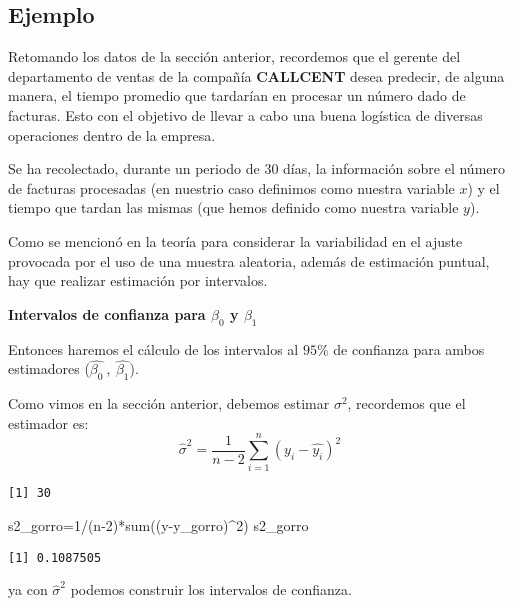 \documentclass[
  a4paper,
  oneside,
  openany]{book}
\newenvironment{Shaded}{\begin{snugshade}}{\end{snugshade}}
\newcommand{\DecValTok}[1]{\textcolor[rgb]{0.00,0.00,0.81}{#1}}
\newcommand{\FunctionTok}[1]{\textcolor[rgb]{0.00,0.00,0.00}{#1}}
\newcommand{\NormalTok}[1]{#1}
\newcommand{\OtherTok}[1]{\textcolor[rgb]{0.56,0.35,0.01}{#1}}
\newcommand{\SpecialCharTok}[1]{\textcolor[rgb]{0.00,0.00,0.00}{#1}}
\begin{document}
\hypertarget{ejemplo-17}{%
\subsection{Ejemplo}\label{ejemplo-17}}

Retomando los datos de la sección anterior, recordemos que el gerente del departamento de ventas de la compañía \textbf{CALLCENT} desea predecir, de alguna manera, el tiempo promedio que tardarían en procesar un número dado de facturas. Esto con el objetivo de llevar a cabo una buena logística de diversas operaciones dentro de la empresa.

Se ha recolectado, durante un periodo de 30 días, la información sobre el número de facturas procesadas (en nuestrio caso definimos como nuestra variable \(x\)) y el tiempo que tardan las mismas (que hemos definido como nuestra variable \(y\)).

Como se mencionó en la teoría para considerar la variabilidad en el ajuste provocada por el uso de una muestra aleatoria, además de estimación puntual, hay que realizar estimación por intervalos.

\textbf{Intervalos de confianza para \(\beta_{0}\) y \(\beta_{1}\)}

Entonces haremos el cálculo de los intervalos al \(95\%\) de confianza para ambos estimadores (\(\hat{\beta_{0}} \ , \ \hat{\beta_{1}}\)).

Como vimos en la sección anterior, debemos estimar \(\sigma^2\), recordemos que el estimador es: \[\hat{\sigma}^2=\frac{1}{n-2}\sum_{i=1}^{n}(y_{i}-\hat{y_{i}})^2\]

\begin{verbatim}
[1] 30
\end{verbatim}

\begin{Shaded}
\begin{Highlighting}[]
\NormalTok{s2\_gorro}\OtherTok{=}\DecValTok{1}\SpecialCharTok{/}\NormalTok{(n}\DecValTok{{-}2}\NormalTok{)}\SpecialCharTok{*}\FunctionTok{sum}\NormalTok{((y}\SpecialCharTok{{-}}\NormalTok{y\_gorro)}\SpecialCharTok{\^{}}\DecValTok{2}\NormalTok{)}
\NormalTok{s2\_gorro}
\end{Highlighting}
\end{Shaded}

\begin{verbatim}
[1] 0.1087505
\end{verbatim}

ya con \(\hat{\sigma}^2\) podemos construir los intervalos de confianza.
\end{document}
